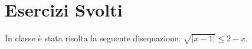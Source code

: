 \section{Esercizi Svolti}
In classe è stata risolta la seguente disequazione: $ \sqrt{|x-1|} \le 2-x $.